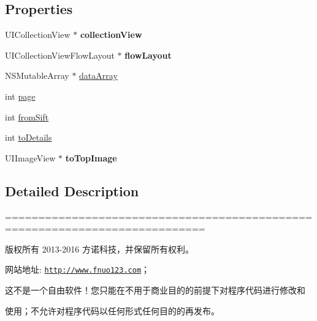\subsection*{Properties}
\begin{DoxyCompactItemize}
\item 
\mbox{\label{category_product_c_v_view_controller_07_08_aec4fe291d4493790216f2af31cf46221}} 
U\+I\+Collection\+View $\ast$ {\bfseries collection\+View}
\item 
\mbox{\label{category_product_c_v_view_controller_07_08_a3c889ad9a685adb76686a779ab80fa1a}} 
U\+I\+Collection\+View\+Flow\+Layout $\ast$ {\bfseries flow\+Layout}
\item 
N\+S\+Mutable\+Array $\ast$ \mbox{\hyperlink{category_product_c_v_view_controller_07_08_a1604fc10c165c00c0ad1260500dcbba6}{data\+Array}}
\item 
int \mbox{\hyperlink{category_product_c_v_view_controller_07_08_a844c5bf2fdbb4a2f222cb56fec7cc46e}{page}}
\item 
int \mbox{\hyperlink{category_product_c_v_view_controller_07_08_a48193cc51877fa2dacb8f59ed0304a07}{from\+Sift}}
\item 
int \mbox{\hyperlink{category_product_c_v_view_controller_07_08_aa43122362d7320215fbe05b731585a24}{to\+Details}}
\item 
\mbox{\label{category_product_c_v_view_controller_07_08_a33be1fb0945628ce1f3e82cb109f16ff}} 
U\+I\+Image\+View $\ast$ {\bfseries to\+Top\+Image}
\end{DoxyCompactItemize}


\subsection{Detailed Description}
============================================================================

版权所有 2013-\/2016 方诺科技，并保留所有权利。

网站地址\+: \href{http://www.fnuo123.com}{\tt http\+://www.\+fnuo123.\+com}； 



这不是一个自由软件！您只能在不用于商业目的的前提下对程序代码进行修改和

使用；不允许对程序代码以任何形式任何目的的再发布。 

